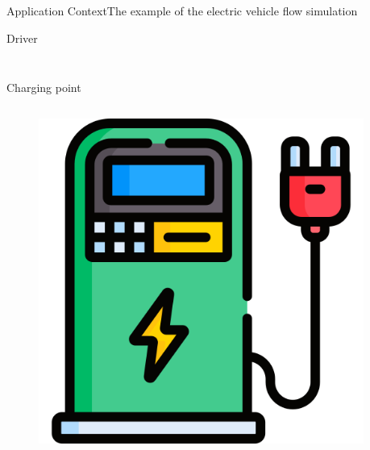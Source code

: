 \begin{frame}{Application Context}{The example of the electric vehicle flow simulation}
{\begin{block}{Driver}
\begin{columns}
\begin{column}{.78\linewidth}
\begin{itemize}
{    }
\end{itemize}
\end{column}
\end{columns}
\end{block}
}{
\begin{block}{Charging point}
\begin{columns}
\begin{column}{.18\linewidth}
\begin{figure}
	\includegraphics[width=\textwidth]{figures/electric-charge.png}
\end{figure}
\end{column}
\begin{column}{.78\linewidth}
\begin{itemize}
\end{itemize}
\end{column}
\end{columns}
\end{block}
}


\end{frame}
